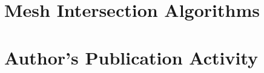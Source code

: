 \documentclass[bibliography=totocnumbered,dvipsnames,FM,Dis]{tulthesis}
\begin{document}

\chapter{Mesh Intersection Algorithms} \label{chap:intersections}







\chapter{Author's Publication Activity} \label{chap:publications}
\end{document}

